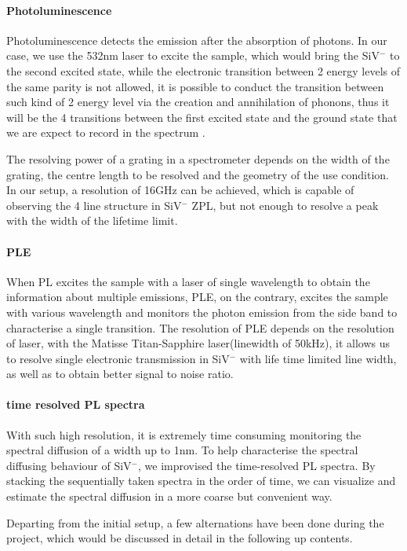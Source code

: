 \paragraph{Photoluminescence} 
Photoluminescence detects the emission after the absorption of photons. In our case, we use the 532nm laser to excite the sample, which would bring the SiV$^{-}$ to the second excited state, while the electronic transition between 2 energy levels of the same parity is not allowed, it is possible to conduct the transition between such kind of 2 energy level via the creation and annihilation of phonons, thus it will be the 4 transitions between the first excited state and the ground state that we are expect to record in the spectrum .

The resolving power of a grating in a spectrometer depends on the width of the grating, the centre length to be resolved and the geometry of the use condition. In our setup, a resolution of 16GHz can be achieved, which is capable of observing the 4 line structure in SiV$^{-}$ ZPL, but not enough to resolve a peak with the width of the lifetime limit. 

\paragraph{PLE} When PL excites the sample with a laser of single wavelength to obtain the information about multiple emissions, PLE, on the contrary, excites the sample with various wavelength and monitors the photon emission from the side band to characterise a single transition. The resolution of PLE depends on the resolution of laser, with the Matisse Titan-Sapphire laser(linewidth of 50kHz), it allows us to resolve single electronic transmission in SiV$^{-}$ with life time limited line width, as well as to obtain better signal to noise ratio. 

\paragraph{time resolved PL spectra} With such high resolution, it is extremely time consuming monitoring the spectral diffusion of a width up to 1nm. To help characterise the spectral diffusing behaviour of SiV$^{-}$, we improvised the time-resolved PL spectra. By stacking the sequentially taken spectra in the order of time, we can visualize and estimate the spectral diffusion in a more coarse but convenient way.
 
Departing from the initial setup, a few alternations have been done during the project, which would be discussed in detail in the following up contents.
